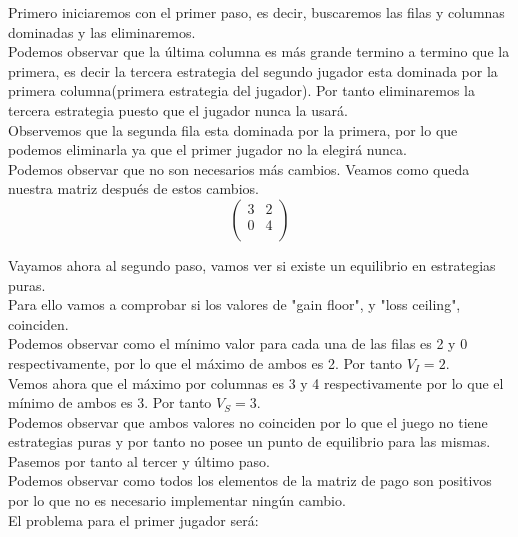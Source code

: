 \documentclass[10pt,a4paper]{book}
\begin{document}
Primero iniciaremos con el primer paso, es decir, buscaremos las filas y columnas dominadas y las eliminaremos.\\

Podemos observar que la última columna es más grande termino a termino que la primera, es decir la tercera estrategia del segundo jugador esta dominada por la primera columna(primera estrategia del jugador). Por tanto eliminaremos la tercera estrategia puesto que el jugador nunca la usará.\\

Observemos que la segunda fila esta dominada por la primera, por lo que podemos eliminarla ya que el primer jugador no la elegirá nunca.\\

Podemos observar que no son necesarios más cambios. Veamos como queda nuestra matriz después de estos cambios.\\

$$
\left(
\begin{array}{cccc}
3 & 2  \\
0 & 4 \\
\end{array}
\right)
$$

Vayamos ahora al segundo paso, vamos ver si existe un equilibrio en estrategias puras.\\
Para ello vamos a comprobar si los valores de "gain floor", y "loss ceiling", coinciden.\\

Podemos observar como el mínimo valor para cada una de las filas es 2 y 0 respectivamente, por lo que el máximo de ambos es 2. Por tanto $V_I=2$.\\

Vemos ahora que el máximo por columnas es 3 y 4 respectivamente por lo que el mínimo de ambos es 3. Por tanto $V_S=3$.\\

Podemos observar que ambos valores no coinciden por lo que el juego no tiene estrategias puras y por tanto no posee un punto de equilibrio para las mismas.\\

Pasemos por tanto al tercer y último paso.\\

Podemos observar como todos los elementos de la matriz de pago son positivos por lo que no es necesario implementar ningún cambio.\\

El problema para el primer jugador será:\\
\end{document}
